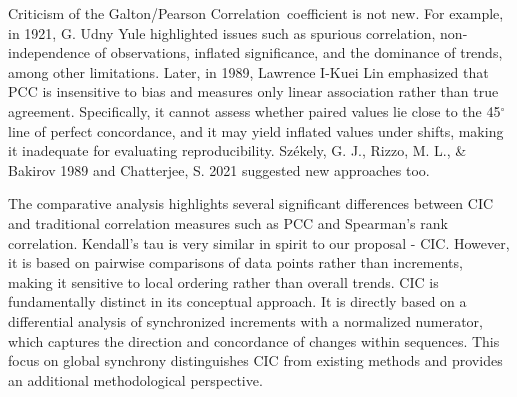 \documentclass[aoas]{imsart}
\newcommand{\cic}{\text{CIC}}
\newcommand{\pcc}{\text{PCC}}
\newcommand{\pccFull}{\textnormal{Galton/Pearson Correlation}}
\begin{document}
Criticism of the \pccFull\ coefficient is not new. For example, in 1921, G. Udny Yule \cite{r1} highlighted issues such as spurious correlation, non-independence of observations, inflated significance, and the dominance of trends, among other limitations. Later, in 1989, Lawrence I-Kuei Lin \cite{r2} emphasized that $\pcc$ is insensitive to bias and measures only linear association rather than true agreement. Specifically, it cannot assess whether paired values lie close to the 45$^\circ$ line of perfect concordance, and it may yield inflated values under shifts, making it inadequate for evaluating reproducibility. Sz\'ekely, G. J., Rizzo, M. L., \& Bakirov 1989 \cite{r4} and Chatterjee, S. 2021 \cite{r5} suggested new approaches too. 

The comparative analysis highlights several significant differences between $\cic$ and traditional correlation measures such as $\pcc$ and Spearman’s rank correlation. Kendall's tau is very similar in spirit to our proposal - CIC. However, it is based on pairwise comparisons of data points rather than increments, making it sensitive to local ordering rather than overall trends.  $\cic$ is fundamentally distinct in its conceptual approach. It is directly based on a differential analysis of synchronized increments with a normalized numerator, which captures the direction and concordance of changes within sequences. This focus on global synchrony distinguishes $\cic$ from existing methods and provides an additional methodological perspective.
\end{document}
